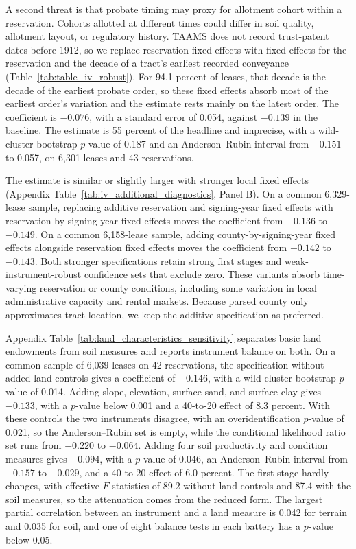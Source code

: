 \documentclass[12pt]{article}
\begin{document}
A second threat is that probate timing may proxy for allotment cohort within a reservation. Cohorts allotted at different times could differ in soil quality, allotment layout, or regulatory history. TAAMS does not record trust-patent dates before 1912, so we replace reservation fixed effects with fixed effects for the reservation and the decade of a tract's earliest recorded conveyance (Table~\ref{tab:table_iv_robust}). For 94.1 percent of leases, that decade is the decade of the earliest probate order, so these fixed effects absorb most of the earliest order's variation and the estimate rests mainly on the latest order. The coefficient is $-0.076$, with a standard error of 0.054, against $-0.139$ in the baseline. The estimate is 55 percent of the headline and imprecise, with a wild-cluster bootstrap $p$-value of 0.187 and an Anderson--Rubin interval from $-0.151$ to 0.057, on 6,301 leases and 43 reservations.

The estimate is similar or slightly larger with stronger local fixed effects (Appendix Table~\ref{tab:iv_additional_diagnostics}, Panel B). On a common 6,329-lease sample, replacing additive reservation and signing-year fixed effects with reservation-by-signing-year fixed effects moves the coefficient from $-0.136$ to $-0.149$. On a common 6,158-lease sample, adding county-by-signing-year fixed effects alongside reservation fixed effects moves the coefficient from $-0.142$ to $-0.143$. Both stronger specifications retain strong first stages and weak-instrument-robust confidence sets that exclude zero. These variants absorb time-varying reservation or county conditions, including some variation in local administrative capacity and rental markets. Because parsed county only approximates tract location, we keep the additive specification as preferred.

Appendix Table~\ref{tab:land_characteristics_sensitivity} separates basic land endowments from soil measures and reports instrument balance on both. On a common sample of 6,039 leases on 42 reservations, the specification without added land controls gives a coefficient of $-0.146$, with a wild-cluster bootstrap $p$-value of 0.014. Adding slope, elevation, surface sand, and surface clay gives $-0.133$, with a $p$-value below 0.001 and a 40-to-20 effect of 8.3 percent. With these controls the two instruments disagree, with an overidentification $p$-value of 0.021, so the Anderson--Rubin set is empty, while the conditional likelihood ratio set runs from $-0.220$ to $-0.064$. Adding four soil productivity and condition measures gives $-0.094$, with a $p$-value of 0.046, an Anderson--Rubin interval from $-0.157$ to $-0.029$, and a 40-to-20 effect of 6.0 percent. The first stage hardly changes, with effective $F$-statistics of 89.2 without land controls and 87.4 with the soil measures, so the attenuation comes from the reduced form. The largest partial correlation between an instrument and a land measure is 0.042 for terrain and 0.035 for soil, and one of eight balance tests in each battery has a $p$-value below 0.05.
\end{document}

